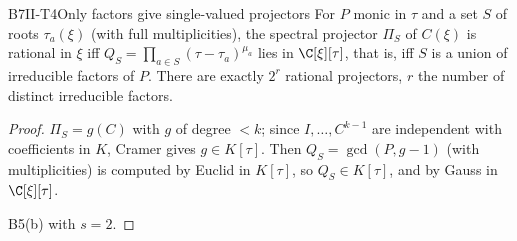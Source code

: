 \begin{dimcard}{B7}{II-T4}{Only factors give single-valued projectors}{\proved}{}
For $P$ monic in $\tau$ and a set $S$ of roots $\tau_a(\xi)$ (with full multiplicities), the spectral projector $\Pi_S$ of $C(\xi)$ is rational in $\xi$ iff $Q_S=\prod_{a\in S}(\tau-\tau_a)^{\mu_a}$ lies in $\C[\xi][\tau]$, that is, iff $S$ is a union of irreducible factors of $P$. There are exactly $2^r$ rational projectors, $r$ the number of distinct irreducible factors.
\end{dimcard}
\begin{proof}
$\Pi_S=g(C)$ with $g$ of degree $<k$; since $I,\dots,C^{k-1}$ are independent with coefficients in $K$, Cramer gives $g\in K[\tau]$. Then $Q_S=\gcd(P,g-1)$ (with multiplicities) is computed by Euclid in $K[\tau]$, so $Q_S\in K[\tau]$, and by Gauss in $\C[\xi][\tau]$.

B5(b) with $s=2$.
\end{proof}

